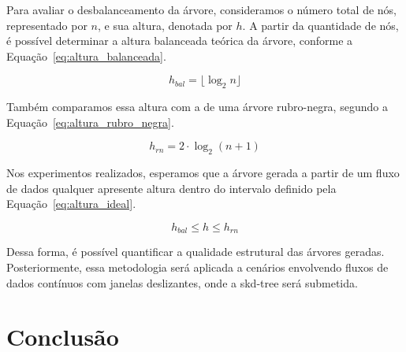 Para avaliar o desbalanceamento da árvore, consideramos o número total de nós, representado por $n$, e sua altura, denotada por $h$. A partir da quantidade de nós, é possível determinar a altura balanceada teórica da árvore, conforme a Equação~\ref{eq:altura_balanceada}.

\begin{equation}
    h_{bal} = \lfloor \log_2 n \rfloor
    \label{eq:altura_balanceada}
\end{equation}

Também comparamos essa altura com a de uma árvore rubro-negra, segundo a Equação~\ref{eq:altura_rubro_negra}.

\begin{equation}
    h_{rn} = 2 \cdot \log_2 (n + 1)
    \label{eq:altura_rubro_negra}
\end{equation}

Nos experimentos realizados, esperamos que a árvore gerada a partir de um fluxo de dados qualquer apresente altura dentro do intervalo definido pela Equação~\ref{eq:altura_ideal}.

\begin{equation}
    h_{bal} \leq h \leq h_{rn}
    \label{eq:altura_ideal}
\end{equation}

Dessa forma, é possível quantificar a qualidade estrutural das árvores geradas. Posteriormente, essa metodologia será aplicada a cenários envolvendo fluxos de dados contínuos com janelas deslizantes, onde a skd-tree será submetida.

\section{Conclusão}
